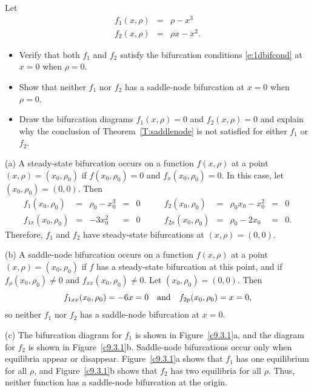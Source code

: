 \documentclass{ximera}
\begin{document}
\begin{exercise} \label{c9.3.1}
Let 
\begin{eqnarray*}
f_1(x,\rho) & = & \rho - x^3 \\
f_2(x,\rho) & = & \rho x - x^2.
\end{eqnarray*}
\begin{itemize}
\item[(a)] Verify that both $f_1$ and $f_2$ satisfy the bifurcation conditions 
\eqref{e:1dbifcond} at $x=0$ when $\rho=0$.
\item[(b)] Show that neither $f_1$ nor $f_2$ has a saddle-node bifurcation
at $x=0$ when $\rho=0$. 
\item[(c)] Draw the bifurcation diagrams $f_1(x,\rho)=0$ and 
$f_2(x,\rho)=0$ and explain why the conclusion of 
Theorem~\ref{T:saddlenode} is not satisfied for either $f_1$ 
or $f_2$.
\end{itemize}

\begin{solution}

(a) A steady-state bifurcation occurs on a function $f(x,\rho)$ at a
point $(x,\rho) = (x_0,\rho_0)$ if $f(x_0,\rho_0) = 0$ and
$f_x(x_0,\rho_0) = 0$.  In this case, let $(x_0,\rho_0) = (0,0)$.
Then
\[ \begin{array}{rcccl}
f_1(x_0,\rho_0) & = & \rho_0 - x_0^3 & = & 0 \\
f_{1x}(x_0,\rho_0) & = & -3x_0^2 & = & 0 \end{array}
\qquad
\begin{array}{rcccl}
f_2(x_0,\rho_0) & = & \rho_0x_0 - x_0^2 & = & 0 \\
f_{2x}(x_0,\rho_0) & = & \rho_0 - 2x_0 & = & 0. \end{array}
\]
Therefore, $f_1$ and $f_2$ have steady-state bifurcations at $(x,\rho)
= (0,0)$.

(b) A saddle-node bifurcation occurs on a function $f(x,\rho)$ at a point
$(x,\rho) = (x_0,\rho_0)$ if $f$ has a steady-state bifurcation at this
point, and if $f_\rho(x_0,\rho_0) \neq 0$ and $f_{xx}(x_0,\rho_0) \neq 0$.
Let $(x_0,\rho_0) = (0,0)$.  Then
\[
f_{1xx}(x_0,\rho_0) = -6x = 0 \quad\mbox{and}\quad
f_{2p}(x_0,\rho_0) = x = 0,
\]
so neither $f_1$ nor $f_2$ has a saddle-node bifurcation at $x = 0$.

(c) The bifurcation diagram for $f_1$ is shown in Figure~\ref{c9.3.1}a, and
the diagram for $f_2$ is shown in Figure~\ref{c9.3.1}b.  Saddle-node
bifurcations occur only when equilibria appear or disappear.
Figure~\ref{c9.3.1}a shows that $f_1$ has one equilibrium for all $\rho$,
and Figure~\ref{c9.3.1}b shows that $f_2$ has two equilibria for all
$\rho$.  Thus, neither function has a saddle-node bifurcation at the origin.



\end{solution}
\end{exercise}
\end{document}
